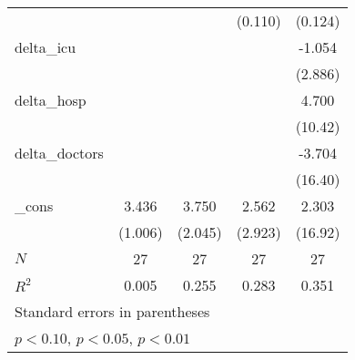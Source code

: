 {\begin{tabular}{l*{4}{c}}
            &                     &                     &     (0.110)         &     (0.124)         \\
[1em]
delta\_icu   &                     &                     &                     &      -1.054         \\
            &                     &                     &                     &     (2.886)         \\
[1em]
delta\_hosp  &                     &                     &                     &       4.700         \\
            &                     &                     &                     &     (10.42)         \\
[1em]
delta\_doctors&                     &                     &                     &      -3.704         \\
            &                     &                     &                     &     (16.40)         \\
[1em]
\_cons      &       3.436\sym{***}&       3.750\sym{*}  &       2.562         &       2.303         \\
            &     (1.006)         &     (2.045)         &     (2.923)         &     (16.92)         \\
\hline
\(N\)       &          27         &          27         &          27         &          27         \\
\(R^{2}\)   &       0.005         &       0.255         &       0.283         &       0.351         \\
\hline\hline
\multicolumn{5}{l}{\footnotesize Standard errors in parentheses}\\
\multicolumn{5}{l}{\footnotesize \sym{*} \(p<0.10\), \sym{**} \(p<0.05\), \sym{***} \(p<0.01\)}\\
\end{tabular}
}
